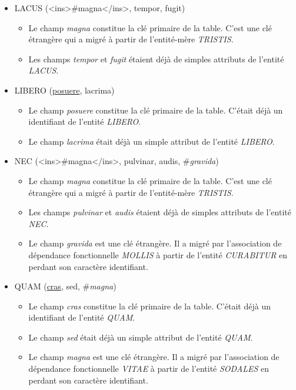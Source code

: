 \documentclass[a4paper]{article}
\newcommand{\relat}[1]{\textsc{#1}}
\newcommand{\attr}[1]{#1}
\newcommand{\prim}[1]{\uline{#1}}
\newcommand{\foreign}[1]{\#\textsl{#1}}
\begin{document}
\begin{itemize}
  \item \relat{LACUS} (<ins>#magna</ins>, \attr{tempor}, \attr{fugit})
  \begin{itemize}
    \item Le champ \emph{magna} constitue la clé primaire de la table. C'est une clé étrangère qui a migré à partir de l'entité-mère \emph{TRISTIS}.
    \item Les champs \emph{tempor} et \emph{fugit} étaient déjà de simples attributs de l'entité \emph{LACUS}.
  \end{itemize}

  \item \relat{LIBERO} (\prim{posuere}, \attr{lacrima})
  \begin{itemize}
    \item Le champ \emph{posuere} constitue la clé primaire de la table. C'était déjà un identifiant de l'entité \emph{LIBERO}.
    \item Le champ \emph{lacrima} était déjà un simple attribut de l'entité \emph{LIBERO}.
  \end{itemize}

  \item \relat{NEC} (<ins>#magna</ins>, \attr{pulvinar}, \attr{audis}, \foreign{gravida})
  \begin{itemize}
    \item Le champ \emph{magna} constitue la clé primaire de la table. C'est une clé étrangère qui a migré à partir de l'entité-mère \emph{TRISTIS}.
    \item Les champs \emph{pulvinar} et \emph{audis} étaient déjà de simples attributs de l'entité \emph{NEC}.
    \item Le champ \emph{gravida} est une clé étrangère. Il a migré par l'association de dépendance fonctionnelle \emph{MOLLIS} à partir de l'entité \emph{CURABITUR} en perdant son caractère identifiant.
  \end{itemize}

  \item \relat{QUAM} (\prim{cras}, \attr{sed}, \foreign{magna})
  \begin{itemize}
    \item Le champ \emph{cras} constitue la clé primaire de la table. C'était déjà un identifiant de l'entité \emph{QUAM}.
    \item Le champ \emph{sed} était déjà un simple attribut de l'entité \emph{QUAM}.
    \item Le champ \emph{magna} est une clé étrangère. Il a migré par l'association de dépendance fonctionnelle \emph{VITAE} à partir de l'entité \emph{SODALES} en perdant son caractère identifiant.
  \end{itemize}


\end{itemize}
\end{document}
